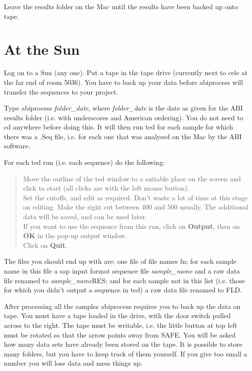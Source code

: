 Leave the results folder on the Mac until the results have been
backed up onto tape.

\section{At the Sun}

Log on to a Sun (any one).  Put a tape in the tape drive (currently next to
cele at the far end of room 5036).  You have to back up your data
before {\sf abiprocess} will transfer the sequences to your project.

Type {\sf abiprocess {\em folder\_date}}, where {\em folder\_date} is
the date as given for the ABI results folder (i.e. with underscores
and American ordering).  You do not need to {\sf cd} anywhere before
doing this.  It will then run {\sf ted} for each sample
for which there was a {\sf .Seq} file, i.e. for each one that was
analysed on the Mac by the ABI software.

For each ted run (i.e. each sequence) do the following:
\begin{verse}
Move the outline of the ted window to a suitable place on the screen and
click to start (all clicks are with the left mouse button).\\
Set the cutoffs, and edit as required.  Don't waste a lot of time at
this stage on editing.  Make the right cut between 400 and 500
usually.  The additional data will be saved, and can be used later.\\
If you want to use the sequence from this run, click on {\bf Output},
then on {\bf OK} in the pop-up output window.\\
Click on {\bf Quit}.
\end{verse}

The files you should end up with are: one file of file names {fn}; for each sample name in this file a sap input format
sequence file {\em sample\_name} and a raw data file renamed to {\sf
{\em sample\_name}RES}; and for each sample not in this list (i.e.
those for which you didn't output a sequence in ted) a raw data file
renamed to {FLD}.

After processing all the samples {\sf abiprocess} requires you to back
up the data on tape.  You must have a tape loaded in the drive, with
the door switch pulled across to the right.  The tape must be
writable, i.e. the little button at top left must be rotated so that
the arrow points away from SAFE.  You will be asked how many data sets
have already been stored on the tape.  It is possible to store many
folders, but you have to keep track of them yourself. If you give too
small a number you will lose data and mess things up.


